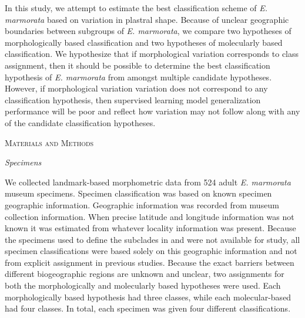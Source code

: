 \documentclass[12pt,letterpaper]{article}\usepackage{graphicx, color}
\renewcommand{\section}[1]{%
\bigskip
\begin{center}
\begin{Large}
\normalfont\scshape #1
\medskip
\end{Large}
\end{center}}
\renewcommand{\subsection}[1]{%
\bigskip
\begin{center}
\begin{large}
\normalfont\itshape #1
\end{large}
\end{center}}
\begin{document}
In this study, we attempt to estimate the best classification scheme of \textit{E. marmorata} based on variation in plastral shape. Because of unclear geographic boundaries between subgroups of \textit{E. marmorata}, we compare two hypotheses of morphologically based classification and two hypotheses of molecularly based classification. We hypothesize that if morphological variation corresponds to class assignment, then it should be possible to determine the best classification hypothesis of \textit{E. marmorata} from amongst multiple candidate hypotheses. However, if morphological variation variation does not correspond to any classification hypothesis, then supervised learning model generalization performance will be poor and reflect how variation may not follow along with any of the candidate classification hypotheses.

\section{Materials and Methods}
\subsection{Specimens}
We collected landmark-based morphometric data from 524 adult \textit{E. marmorata} museum specimens. Specimen classification was based on known specimen geographic information. Geographic information was recorded from museum collection information. When precise latitude and longitude information was not known it was estimated from whatever locality information was present. Because the specimens used to define the subclades in \citet{Spinks2005} and \citet{Spinks2010} were not available for study, all specimen classifications were based solely on this geographic information and not from explicit assignment in previous studies. Because the exact barriers between different biogeographic regions are unknown and unclear, two assignments for both the morphologically and molecularly based hypotheses were used. Each morphologically based hypothesis had three classes, while each molecular-based had four classes. In total, each specimen was given four different classifications. 
\end{document}
